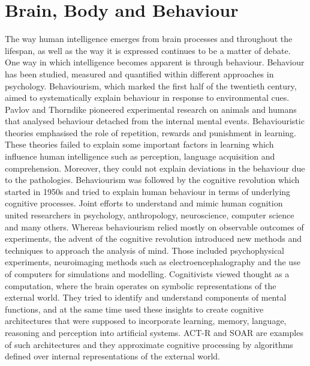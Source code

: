 \section{Brain, Body and Behaviour}
The way human intelligence emerges from brain processes and throughout the 
lifespan, as well as the way it is expressed continues to be a matter of 
debate. One way in which intelligence becomes apparent is through behaviour. 
Behaviour has been studied, measured and quantified within different approaches 
in psychology.
Behaviourism, which marked the first half of the twentieth century, aimed to 
systematically explain behaviour in response to environmental cues. Pavlov and 
Thorndike pioneered experimental research on animals and humans that analysed 
behaviour detached from the internal mental events. Behaviouristic theories 
emphasised the role of repetition, rewards and punishment in learning. These 
theories failed to explain some important factors in learning which influence 
human intelligence such as perception, language acquisition and comprehension. 
Moreover, they could not explain deviations in the behaviour due to 
the pathologies. Behaviourism was followed by the cognitive revolution which 
started in 1950s and tried to explain human behaviour in terms of underlying 
cognitive processes. Joint efforts to understand and mimic human cognition 
united researchers in psychology, anthropology, neuroscience, computer science 
and many others. Whereas behaviourism relied mostly on observable outcomes of 
experiments, the advent of the cognitive revolution introduced new methods and 
techniques to approach the analysis of mind. Those included psychophysical 
experiments, neuroimaging methods such as electroencephalography and the use of 
computers for simulations and modelling. Cognitivists viewed thought as a 
computation, where the brain operates on symbolic representations of the 
external 
world. They tried to identify and understand components of mental functions, 
and at the same time used these insights to create cognitive architectures that 
were supposed to incorporate learning, memory, language, reasoning and 
perception into artificial systems.
ACT-R \citep{Anderson1997} and SOAR \citep{Laird87} are examples of such 
architectures and they approximate cognitive processing by algorithms defined 
over internal representations of the external world.

